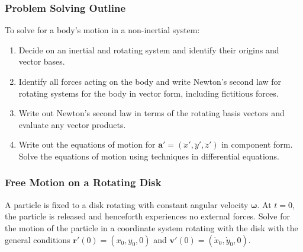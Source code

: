 \documentclass[11pt, a4paper]{article}
\begin{document}
\subsubsection{Problem Solving Outline} To solve for a body's motion in a non-inertial system:
\begin{enumerate}
	\item Decide on an inertial and rotating system and identify their origins and vector bases.
	
	\item Identify all forces acting on the body and write Newton's second law for rotating systems for the body in vector form, including fictitious forces.
	
	\item Write out Newton's second law in terms of the rotating basis vectors and evaluate any vector products.
	
	\item Write out the equations of motion for $ \bm{a}' = (\ddot{x}', \ddot{y}', \ddot{z}') $ in component form. Solve the equations of motion using techniques in differential equations.
\end{enumerate}

\subsubsection{Free Motion on a Rotating Disk}
A particle is fixed to a disk rotating with constant angular velocity $ \bm{\omega} $. At $ t = 0 $, the particle is released and henceforth experiences no external forces. Solve for the motion of the particle in a coordinate system rotating with the disk with the general conditions $ \bm{r}'(0) = (x_0, y_0, 0)$ and $ \bm{v}'(0) = (\dot{x}_0, \dot{y}_0, 0)$.
\end{document}
